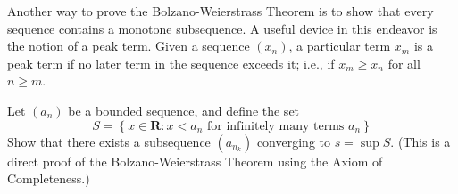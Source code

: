 \begin{solution}
  \TODO
\end{solution}

\begin{exercise}
  Another way to prove the Bolzano-Weierstrass Theorem is to show that every sequence contains a monotone subsequence. A useful device in this endeavor is the notion of a peak term. Given a sequence $\left(x_{n}\right)$, a particular term $x_{m}$ is a peak term if no later term in the sequence exceeds it; i.e., if $x_{m} \geq x_{n}$ for all $n \geq m$.
\end{exercise}

\begin{solution}
  \enum{
  \item \TODO
  \item \TODO
  }
\end{solution}


\begin{exercise}
  Let $\left(a_{n}\right)$ be a bounded sequence, and define the set
  $$
  S=\left\{x \in \mathbf{R}: x<a_{n} \text { for infinitely many terms } a_{n}\right\}
  $$
  Show that there exists a subsequence $\left(a_{n_{k}}\right)$ converging to $s=\sup S$. (This is a direct proof of the Bolzano-Weierstrass Theorem using the Axiom of Completeness.)
\end{exercise}

\begin{solution}
  \TODO
\end{solution}
